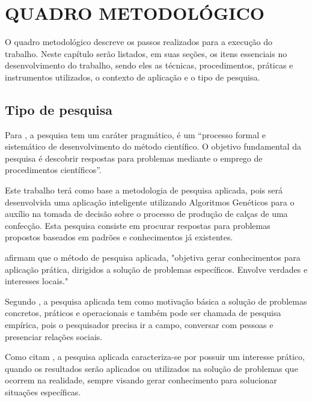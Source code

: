 \chapter{QUADRO METODOLÓGICO}
\par O quadro metodológico descreve os passos realizados para a 
execução do trabalho. Neste capítulo serão listados, em suas seções, os
itens essenciais no desenvolvimento do trabalho, sendo eles as técnicas, procedimentos, práticas e instrumentos
utilizados, o contexto de aplicação e o tipo de pesquisa.

\section{Tipo de pesquisa}

\par Para , a pesquisa tem um caráter
pragmático, é um “processo formal e sistemático de desenvolvimento do método científico. 
O objetivo fundamental da pesquisa é descobrir respostas para problemas mediante
o emprego de procedimentos científicos”.

\par Este trabalho terá como base a metodologia de pesquisa aplicada, pois
será desenvolvida uma aplicação inteligente utilizando Algoritmos Genéticos para
o auxílio na tomada de decisão sobre o processo de produção de calças de uma
confecção. Esta pesquisa consiste em procurar respostas para problemas propostos
baseados em padrões e conhecimentos já existentes.

\par {} afirmam que o método de
pesquisa aplicada, "objetiva gerar conhecimentos para aplicação prática, dirigidos a
solução de problemas específicos. Envolve verdades e interesses locais."  

\par Segundo , a pesquisa
aplicada tem como motivação básica a solução de problemas
concretos, práticos e operacionais e também pode ser chamada de pesquisa
empírica, pois o pesquisador precisa ir a campo, conversar com pessoas e
presenciar relações sociais.

\par Como citam , a pesquisa aplicada
caracteriza-se por possuir um interesse prático, quando os resultados serão aplicados ou utilizados na
solução de problemas que ocorrem na realidade, sempre visando gerar conhecimento
para solucionar situações específicas.


